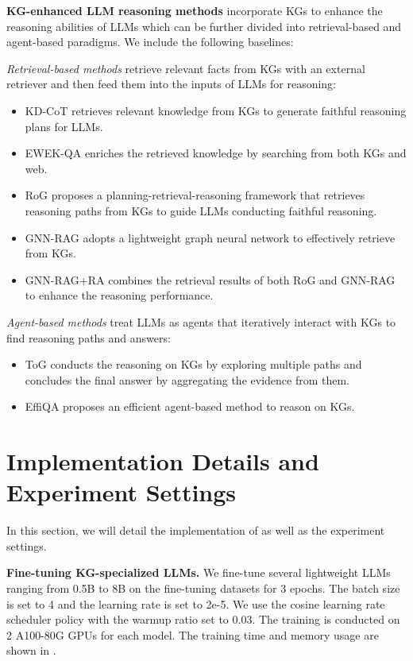 \noindent\textbf{KG-enhanced LLM reasoning methods} incorporate KGs to enhance the reasoning abilities of LLMs which can be further divided into retrieval-based and agent-based paradigms. We include the following baselines:

\emph{Retrieval-based methods} retrieve relevant facts from KGs with an external retriever and then feed them into the inputs of LLMs for reasoning:
\begin{itemize}
    \item KD-CoT \citep{wang2023knowledge} retrieves relevant knowledge from KGs to generate faithful reasoning plans for LLMs.
    \item EWEK-QA \citep{dehghan-etal-2024-ewek} enriches the retrieved knowledge by searching from both KGs and web.
    \item RoG \citep{luo2024rog} proposes a planning-retrieval-reasoning framework that retrieves reasoning paths from KGs to guide LLMs conducting faithful reasoning.
    \item GNN-RAG \citep{mavromatis2024gnn} adopts a lightweight graph neural network to effectively retrieve from KGs.
    \item GNN-RAG+RA \citep{mavromatis2024gnn} combines the retrieval results of both RoG and GNN-RAG to enhance the reasoning performance.
\end{itemize}

\emph{Agent-based methods} treat LLMs as agents that iteratively interact with KGs to find reasoning paths and answers:
\begin{itemize}
    \item ToG \citep{sunthink} conducts the reasoning on KGs by exploring multiple paths and concludes the final answer by aggregating the evidence from them.
    \item EffiQA \citep{jiang2024kg} proposes an efficient agent-based method to reason on KGs.
\end{itemize}

\section{Implementation Details and Experiment Settings}\label{app:implementation}
In this section, we will detail the implementation of \ourmethod as well as the experiment settings.

\noindent\textbf{Fine-tuning KG-specialized LLMs.} We fine-tune several lightweight LLMs ranging from 0.5B to 8B \citep{qwen2,touvron2023llama,llama3} on the fine-tuning datasets for 3 epochs. The batch size is set to 4 and the learning rate is set to 2e-5. We use the cosine learning rate scheduler policy with the warmup ratio set to 0.03. The training is conducted on 2 A100-80G GPUs for each model. The training time and memory usage are shown in .



